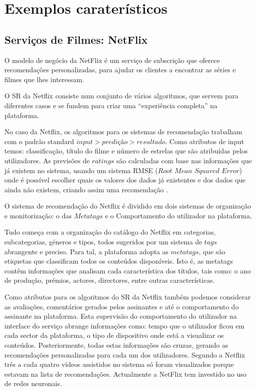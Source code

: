 \section{Exemplos caraterísticos}
\subsection{ Serviços de Filmes: NetFlix}
\hfill
\par O modelo de negócio da NetFlix é um serviço de subscrição que oferece recomendações personalizadas, para ajudar os clientes a encontrar as séries e filmes que lhes interessam.
\par O SR da Netflix consiste num conjunto de vários algoritmos, que servem para diferentes casos e se fundem para criar uma “experiência completa” na plataforma.
\par No caso da Netflix, os algoritmos para os sistemas de recomendação trabalham com o padrão standard $input> predição> resultado$. Como atributos de input temos: classificação, título do filme e número de estrelas que são atribuídas pelos utilizadores. As previsões de $ratings$ são calculadas com base nas informações que já existem no sistema, usando um sistema RMSE ($Root$ $Mean$ $Squared$ $Error$) onde é possível escolher quais os valores dos dados já existentes e dos dados que ainda não existem, criando assim uma recomendação \cite{ref_url1}.
\par O sistema de recomendação do Netflix é dividido em dois sistemas de organização e monitorização: o das $Metatags$ e o Comportamento do utilizador na plataforma. 
\par Tudo começa com a organização do catálogo do Netflix em categorias, subcategorias, géneros e tipos, todos sugeridos por um sistema de $tags$ abrangente e preciso. Para tal, a plataforma adopta as $metatags$, que são etiquetas que classificam todos os conteúdos disponíveis. Isto é, as metatags contêm informações que analisam cada característica dos títulos, tais como: o ano de produção, prémios, actores, directores, entre outras características. 
\par Como atributos para os algoritmos do SR da Netflix também podemos considerar as avaliações, comentários gerados pelos assinantes e até o comportamento do assinante na plataforma. Esta supervisão do comportamento do utilizador na interface do serviço abrange informações como: tempo que o utilizador ficou em cada sector da plataforma, o tipo de dispositivo onde está a visualizar os conteúdos. Posteriormente, todas estas informações são cruzas, gerando as recomendações personalizadas para cada um dos utilizadores. Segundo a Netflix três a cada quatro vídeos assistidos no sistema só foram visualizados porque estavam na lista de recomendações. Actualmente a NetFlix tem investido no uso de redes neuronais.





